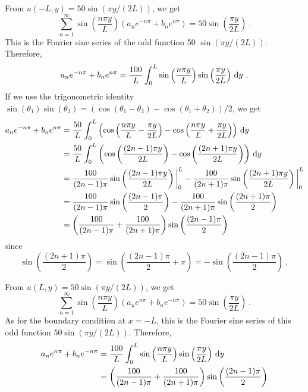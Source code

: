 \begin{egg}
From $\displaystyle u(-L,y) = 50 \sin\left(\pi y/(2L)\right)$, we get
\[
\sum_{n=1}^\infty \sin\left(\frac{n\pi y}{L}\right)
\left(a_n e^{-n\pi} + b_n e^{n\pi} \right) =
50 \sin\left(\frac{\pi y}{2L}\right) \ .
\]
This is the Fourier sine series of the odd function 50
$\sin\left(\pi y/(2L)\right)$.  Therefore,
\[
a_n e^{-n\pi} + b_n e^{n\pi} =
\frac{100}{L} \int_0^L \sin\left(\frac{n\pi y}{L}\right)
\sin\left(\frac{\pi y}{2L}\right) \,\mathrm{d}{y} \ .
\]
If we use the trigonometric identity
$\displaystyle \sin(\theta_1)\sin(\theta_2) = 
\left(\cos(\theta_1-\theta_2) -\cos(\theta_1+\theta_2)\right)/2$,
we get
\begin{align}
a_n e^{-n\pi} + b_n e^{n\pi} &=
\frac{50}{L} \int_0^L \left( \cos\left(\frac{n\pi y}{L}-\frac{\pi y}{2L}\right)
- \cos\left(\frac{n\pi y}{L}+\frac{\pi y}{2L}\right)\right) \,\mathrm{d}{y}
\nonumber \\
&= \frac{50}{L} \int_0^L \left( \cos\left(\frac{(2n-1)\pi y}{2L}\right)
- \cos\left(\frac{(2n+1)\pi y}{2L}\right)\right) \,\mathrm{d}{y} \nonumber \\
&= \frac{100}{(2n-1)\pi} \sin\left(\frac{(2n-1)\pi y}{2L}\right)\bigg|_0^L
- \frac{100}{(2n+1)\pi} \sin\left(\frac{(2n+1)\pi y}{2L}\right)\bigg|_0^L
\nonumber \\
&= \frac{100}{(2n-1)\pi} \sin\left(\frac{(2n-1)\pi}{2}\right)
- \frac{100}{(2n+1)\pi} \sin\left(\frac{(2n+1)\pi}{2}\right) \nonumber \\
&= \left( \frac{100}{(2n-1)\pi} + \frac{100}{(2n+1)\pi}\right)
\sin\left(\frac{(2n-1)\pi}{2}\right)  \label{laplace_spv_egg2a}
\end{align}
since
\[
\sin\left(\frac{(2n+1)\pi}{2}\right) =
\sin\left(\frac{(2n-1)\pi}{2} + \pi\right)
= -\sin\left(\frac{(2n-1)\pi}{2}\right) \ ,
\]

From $\displaystyle u(L,y) = 50 \sin\left(\pi y/(2L)\right)$,
we get
\[
\sum_{n=1}^\infty \sin\left(\frac{n\pi y}{L}\right)
\left(a_n e^{n\pi} + b_n e^{-n\pi} \right) =
50 \sin\left(\frac{\pi y}{2L}\right) \ .
\]
As for the boundary condition at $x=-L$, this is the Fourier sine series of
this odd function $50 \sin\left(\pi y/(2L)\right)$.  Therefore,
\begin{align}
a_n e^{n\pi} + b_n e^{-n\pi} &=
\frac{100}{L} \int_0^L \sin\left(\frac{n\pi y}{L}\right)
\sin\left(\frac{\pi y}{2L}\right) \,\mathrm{d}{y} \nonumber \\
&= \left( \frac{100}{(2n-1)\pi} + \frac{100}{(2n+1)\pi}\right)
\sin\left(\frac{(2n-1)\pi}{2}\right) \label{laplace_spv_egg2b}
\end{align}


\end{egg}
